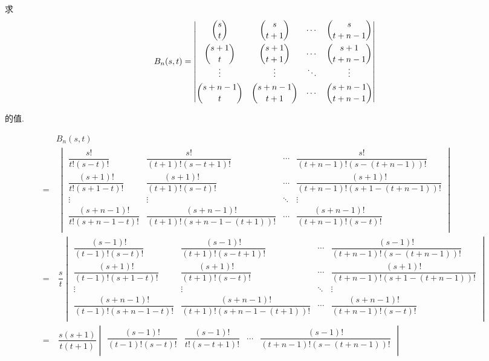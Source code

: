 \documentclass{ctexart}
\begin{document}
\begin{exercise}%
    求
    \[B_n(s,t)=\begin{vmatrix}
        \dbinom{s}{t} & \dbinom{s}{t+1} & \cdots & \dbinom{s}{t+n-1} \\[10pt]
        \dbinom{s+1}{t} & \dbinom{s+1}{t+1} & \cdots & \dbinom{s+1}{t+n-1} \\
        \vdots & \vdots & \ddots & \vdots \\[4pt]
        \dbinom{s+n-1}{t} & \dbinom{s+n-1}{t+1} & \cdots & \dbinom{s+n-1}{t+n-1} \\
    \end{vmatrix}\]

    的值.
\end{exercise}
\begin{solution}
    \begin{align*}
        & B_n(s,t) \\
        = & \ \begin{vmatrix}
            \dfrac{s!}{t!(s-t)!} & \dfrac{s!}{(t+1)!(s-t+1)!} & \cdots & \dfrac{s!}{(t+n-1)!(s-(t+n-1))!} \\[10pt]
            \dfrac{(s+1)!}{t!(s+1-t)!} & \dfrac{(s+1)!}{(t+1)!(s-t)!} & \cdots & \dfrac{(s+1)!}{(t+n-1)!(s+1-(t+n-1))!} \\
            \vdots & \vdots & \ddots & \vdots \\[4pt]
            \dfrac{(s+n-1)!}{t!(s+n-1-t)!} & \dfrac{(s+n-1)!}{(t+1)!(s+n-1-(t+1))!} & \cdots & \dfrac{(s+n-1)!}{(t+n-1)!(s-t)!} \\
        \end{vmatrix} \\
        = & \ \dfrac{s}{t}\begin{vmatrix}
            \dfrac{(s-1)!}{(t-1)!(s-t)!} & \dfrac{(s-1)!}{(t+1)!(s-t+1)!} & \cdots & \dfrac{(s-1)!}{(t+n-1)!(s-(t+n-1))!} \\[10pt]
            \dfrac{(s+1)!}{(t-1)!(s+1-t)!} & \dfrac{(s+1)!}{(t+1)!(s-t)!} & \cdots & \dfrac{(s+1)!}{(t+n-1)!(s+1-(t+n-1))!} \\
            \vdots & \vdots & \ddots & \vdots \\[4pt]
            \dfrac{(s+n-1)!}{(t-1)!(s+n-1-t)!} & \dfrac{(s+n-1)!}{(t+1)!(s+n-1-(t+1))!} & \cdots & \dfrac{(s+n-1)!}{(t+n-1)!(s-t)!} \\
        \end{vmatrix} \\
        = & \ \dfrac{s(s+1)}{t(t+1)}\begin{vmatrix}
            \dfrac{(s-1)!}{(t-1)!(s-t)!} & \dfrac{(s-1)!}{t!(s-t+1)!} & \cdots & \dfrac{(s-1)!}{(t+n-1)!(s-(t+n-1))!} \\[10pt]

\end{vmatrix}
\end{align*}
\end{solution}
\end{document}
